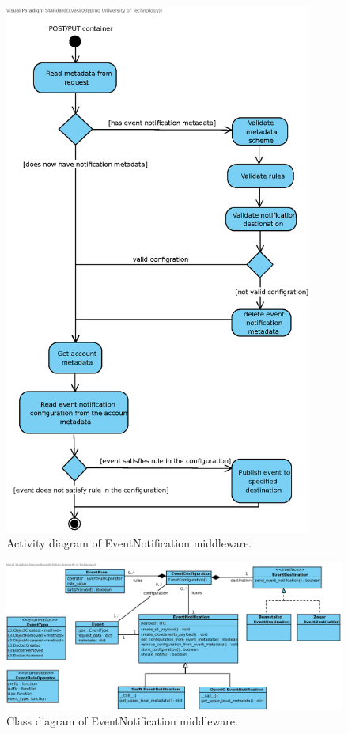     \begin{figure}[H]
        \centering
        \includegraphics[width=0.9\textwidth]{obrazky-figures/middleware-activity-diagram.eps}
        \caption{Activity diagram of EventNotification middleware.}
        \label{fig:middlewareActivity}
    \end{figure}

    \begin{figure}[H]
        \centering
        \includegraphics[angle=90,height=0.96\textheight]{obrazky-figures/eventnotifications_class_diagram.eps}
        \caption{Class diagram of EventNotification middleware.}
        \label{fig:middlewareClassDiagram}
    \end{figure}


